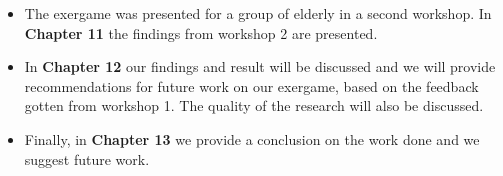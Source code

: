 \begin{itemize}
\item The exergame was presented for a group of elderly in a second workshop. In \textbf{Chapter 11} the findings from workshop 2 are presented.
\item In \textbf{Chapter 12} our findings and result will be discussed and we will provide recommendations for future work on our exergame, based on the feedback gotten from workshop 1. The quality of the research will also be discussed.
\item Finally, in \textbf{Chapter 13} we provide a conclusion on the work done and we suggest future work.

\end{itemize}
